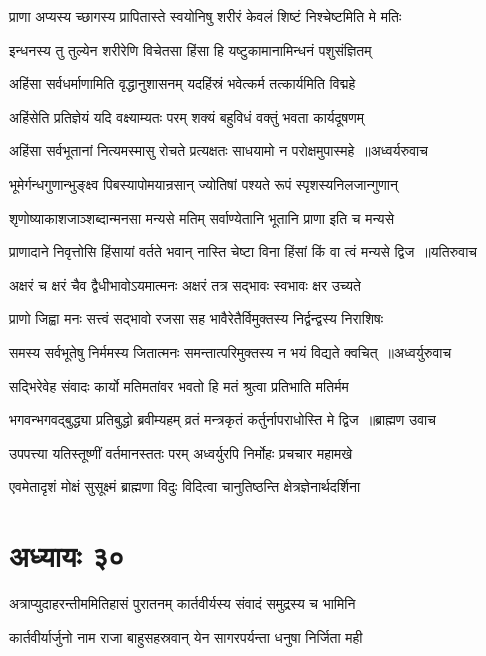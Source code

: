 \twolineshloka
{प्राणा अप्यस्य च्छागस्य प्रापितास्ते स्वयोनिषु}
{शरीरं केवलं शिष्टं निश्चेष्टमिति मे मतिः}


\twolineshloka
{इन्धनस्य तु तुल्येन शरीरेणि विचेतसा}
{हिंसा हि यष्टुकामानामिन्धनं पशुसंज्ञितम्}


\twolineshloka
{अहिंसा सर्वधर्माणामिति वृद्धानुशासनम्}
{यदहिंस्रं भवेत्कर्म तत्कार्यमिति विद्महे}


\twolineshloka
{अहिंसेति प्रतिज्ञेयं यदि वक्ष्याम्यतः परम्}
{शक्यं बहुविधं वक्तुं भवता कार्यदूषणम्}


\threelineshloka
{अहिंसा सर्वभूतानां नित्यमस्मासु रोचते}
{प्रत्यक्षतः साधयामो न परोक्षमुपास्महे ॥अध्वर्यरुवाच}
{}


\twolineshloka
{भूमेर्गन्धगुणान्भुङ्क्ष्व पिबस्यापोमयान्रसान्}
{ज्योतिषां पश्यते रूपं स्पृशस्यनिलजान्गुणान्}


\twolineshloka
{शृणोष्याकाशजाञ्शब्दान्मनसा मन्यसे मतिम्}
{सर्वाण्येतानि भूतानि प्राणा इति च मन्यसे}


\threelineshloka
{प्राणादाने निवृत्तोसि हिंसायां वर्तते भवान्}
{नास्ति चेष्टा विना हिंसां किं वा त्वं मन्यसे द्विज ॥यतिरुवाच}
{}


\twolineshloka
{अक्षरं च क्षरं चैव द्वैधीभावोऽयमात्मनः}
{अक्षरं तत्र सद्भावः स्वभावः क्षर उच्यते}


\twolineshloka
{प्राणो जिह्वा मनः सत्त्वं सद्भावो रजसा सह}
{भावैरेतैर्विमुक्तस्य निर्द्वन्द्वस्य निराशिषः}


\threelineshloka
{समस्य सर्वभूतेषु निर्ममस्य जितात्मनः}
{समन्तात्परिमुक्तस्य न भयं विद्यते क्वचित् ॥अध्वर्युरुवाच}
{}


\twolineshloka
{सद्भिरेवेह संवादः कार्यो मतिमतांवर}
{भवतो हि मतं श्रुत्वा प्रतिभाति मतिर्मम}


\threelineshloka
{भगवन्भगवद्बुद्ध्या प्रतिबुद्धो ब्रवीम्यहम्}
{व्रतं मन्त्रकृतं कर्तुर्नापराधोस्ति मे द्विज ॥ब्राह्मण उवाच}
{}


\twolineshloka
{उपपत्त्या यतिस्तूष्णीं वर्तमानस्ततः परम्}
{अध्वर्युरपि निर्मोहः प्रचचार महामखे}


\twolineshloka
{एवमेतादृशं मोक्षं सुसूक्ष्मं ब्राह्मणा विदुः}
{विदित्वा चानुतिष्ठन्ति क्षेत्रज्ञेनार्थदर्शिना}


\chapter{अध्यायः ३०}
\twolineshloka
{अत्राप्युदाहरन्तीममितिहासं पुरातनम्}
{कार्तवीर्यस्य संवादं समुद्रस्य च भामिनि}


\twolineshloka
{कार्तवीर्यार्जुनो नाम राजा बाहुसहस्रवान्}
{येन सागरपर्यन्ता धनुषा निर्जिता मही}


